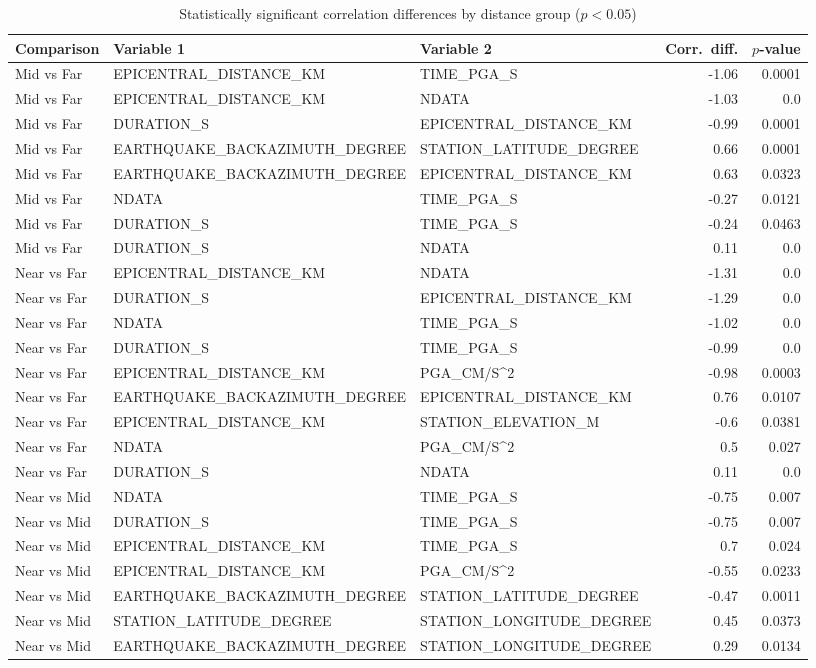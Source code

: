 \begin{table}[H]
\centering
\caption{Statistically significant correlation differences by distance group ($p < 0.05$)}
\label{tab:corr_diff}
\begin{tabular}{lllrr}
\toprule
Comparison & Variable 1 & Variable 2 & Corr.\ diff. & $p$-value \\
\midrule
Mid vs Far & EPICENTRAL_DISTANCE_KM & TIME_PGA_S & -1.06 & 0.0001 \\
Mid vs Far & EPICENTRAL_DISTANCE_KM & NDATA & -1.03 & 0.0 \\
Mid vs Far & DURATION_S & EPICENTRAL_DISTANCE_KM & -0.99 & 0.0001 \\
Mid vs Far & EARTHQUAKE_BACKAZIMUTH_DEGREE & STATION_LATITUDE_DEGREE & 0.66 & 0.0001 \\
Mid vs Far & EARTHQUAKE_BACKAZIMUTH_DEGREE & EPICENTRAL_DISTANCE_KM & 0.63 & 0.0323 \\
Mid vs Far & NDATA & TIME_PGA_S & -0.27 & 0.0121 \\
Mid vs Far & DURATION_S & TIME_PGA_S & -0.24 & 0.0463 \\
Mid vs Far & DURATION_S & NDATA & 0.11 & 0.0 \\
Near vs Far & EPICENTRAL_DISTANCE_KM & NDATA & -1.31 & 0.0 \\
Near vs Far & DURATION_S & EPICENTRAL_DISTANCE_KM & -1.29 & 0.0 \\
Near vs Far & NDATA & TIME_PGA_S & -1.02 & 0.0 \\
Near vs Far & DURATION_S & TIME_PGA_S & -0.99 & 0.0 \\
Near vs Far & EPICENTRAL_DISTANCE_KM & PGA_CM/S^2 & -0.98 & 0.0003 \\
Near vs Far & EARTHQUAKE_BACKAZIMUTH_DEGREE & EPICENTRAL_DISTANCE_KM & 0.76 & 0.0107 \\
Near vs Far & EPICENTRAL_DISTANCE_KM & STATION_ELEVATION_M & -0.6 & 0.0381 \\
Near vs Far & NDATA & PGA_CM/S^2 & 0.5 & 0.027 \\
Near vs Far & DURATION_S & NDATA & 0.11 & 0.0 \\
Near vs Mid & NDATA & TIME_PGA_S & -0.75 & 0.007 \\
Near vs Mid & DURATION_S & TIME_PGA_S & -0.75 & 0.007 \\
Near vs Mid & EPICENTRAL_DISTANCE_KM & TIME_PGA_S & 0.7 & 0.024 \\
Near vs Mid & EPICENTRAL_DISTANCE_KM & PGA_CM/S^2 & -0.55 & 0.0233 \\
Near vs Mid & EARTHQUAKE_BACKAZIMUTH_DEGREE & STATION_LATITUDE_DEGREE & -0.47 & 0.0011 \\
Near vs Mid & STATION_LATITUDE_DEGREE & STATION_LONGITUDE_DEGREE & 0.45 & 0.0373 \\
Near vs Mid & EARTHQUAKE_BACKAZIMUTH_DEGREE & STATION_LONGITUDE_DEGREE & 0.29 & 0.0134 \\
\bottomrule
\end{tabular}
\end{table}
